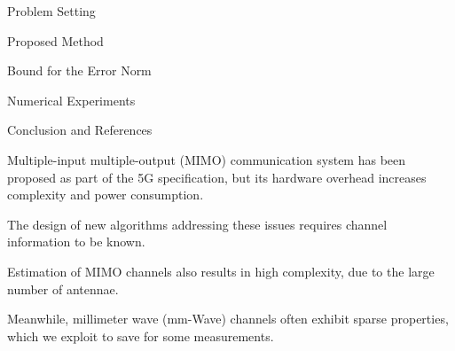

\Title {\TitleText}
\blank [big]

\Subtitle {\AuthorText}
\blank [big]

\Subsubtitle {\DateText}

\page [yes]
{
\I Problem Setting

\I Proposed Method

\I Bound for the Error Norm

\I Numerical Experiments

\I Conclusion and References
}
{
\I Multiple-input multiple-output (MIMO) communication system has been proposed as part of the 5G specification, but its hardware overhead increases complexity and power consumption.

\I The design of new algorithms addressing these issues requires channel information to be known.

\I Estimation of MIMO channels also results in high complexity, due to the large number of antennae.

\I Meanwhile, millimeter wave (mm-Wave) channels often exhibit sparse properties, which we exploit to save for some measurements.
}

